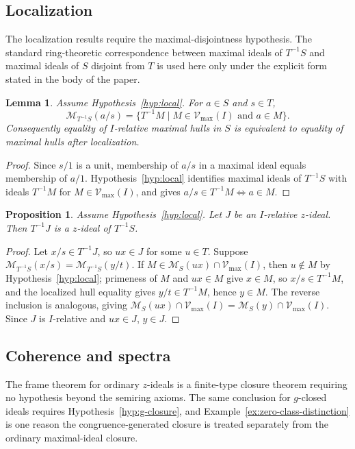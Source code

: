 \documentclass[11pt,leqno]{amsart}
\theoremstyle{plain}
\newtheorem{proposition}[theorem]{Proposition}
\newtheorem{lemma}[theorem]{Lemma}
\theoremstyle{definition}
\theoremstyle{remark}
\numberwithin{equation}{section}
\newcommand{\M}{\mathcal M}
\begin{document}
\subsection{Localization}

The localization results require the maximal-disjointness hypothesis.
The standard ring-theoretic correspondence between maximal ideals of
$T^{-1}S$ and maximal ideals of $S$ disjoint from $T$ is used here
only under the explicit form stated in the body of the paper.

\begin{lemma}\label{app:local-hull-expanded}
Assume Hypothesis~\ref{hyp:local}.
For $a\in S$ and $s\in T$,
\[
\M_{T^{-1}S}(a/s)=\{T^{-1}M\mid M\in\mathcal{V}_{\max}(I)
\text{ and }a\in M\}.
\]
Consequently equality of $I$-relative maximal hulls in $S$ is
equivalent to equality of maximal hulls after localization.
\end{lemma}
\begin{proof}
Since $s/1$ is a unit, membership of $a/s$ in a maximal ideal equals
membership of $a/1$.
Hypothesis~\ref{hyp:local} identifies maximal ideals of $T^{-1}S$
with ideals $T^{-1}M$ for $M\in\mathcal{V}_{\max}(I)$,
and gives $a/s\in T^{-1}M\Leftrightarrow a\in M$.
\end{proof}

\begin{proposition}\label{app:local-z-expanded}
Assume Hypothesis~\ref{hyp:local}.
Let $J$ be an $I$-relative $z$-ideal.
Then $T^{-1}J$ is a $z$-ideal of $T^{-1}S$.
\end{proposition}
\begin{proof}
Let $x/s\in T^{-1}J$, so $ux\in J$ for some $u\in T$.
Suppose $\M_{T^{-1}S}(x/s)=\M_{T^{-1}S}(y/t)$.
If $M\in\M_S(ux)\cap\mathcal{V}_{\max}(I)$,
then $u\notin M$ by Hypothesis~\ref{hyp:local};
primeness of $M$ and $ux\in M$ give $x\in M$,
so $x/s\in T^{-1}M$, and the localized hull equality gives
$y/t\in T^{-1}M$, hence $y\in M$.
The reverse inclusion is analogous, giving
$\M_S(ux)\cap\mathcal{V}_{\max}(I)=\M_S(y)\cap\mathcal{V}_{\max}(I)$.
Since $J$ is $I$-relative and $ux\in J$, $y\in J$.
\end{proof}

\subsection{Coherence and spectra}

The frame theorem for ordinary $z$-ideals is a finite-type closure
theorem requiring no hypothesis beyond the semiring axioms.
The same conclusion for $g$-closed ideals requires
Hypothesis~\ref{hyp:g-closure}, and
Example~\ref{ex:zero-class-distinction} is one reason the
congruence-generated closure is treated separately from the ordinary
maximal-ideal closure.
\end{document}

